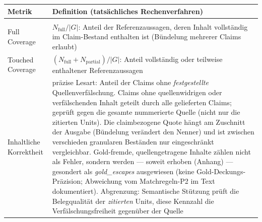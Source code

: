 
\begin{table}[htbp]
  \centering
  \small
  \begin{tabular}{>{\raggedright\arraybackslash}p{}>{\raggedright\arraybackslash}p{}}
    \hline
    \textbf{Metrik} & \textbf{Definition (tatsächliches Rechenverfahren)} \\
    \hline
    \multicolumn{2}{l}{\emph{Ergebnisqualität und Quellenbindung}} \\
    Full Coverage & $N_{\mathrm{full}}/|G|$: Anteil der Referenzaussagen, deren Inhalt vollständig im Claim-Bestand enthalten ist (Bündelung mehrerer Claims erlaubt) \\
    Touched Coverage & $(N_{\mathrm{full}}+N_{\mathrm{partial}})/|G|$: Anteil vollständig oder teilweise enthaltener Referenzaussagen \\
    Inhaltliche Korrektheit & präzise Lesart: Anteil der Claims ohne \emph{festgestellte} Quellenverfälschung. Claims ohne quellenwidrigen oder verfälschenden Inhalt geteilt durch alle gelieferten Claims; geprüft gegen die gesamte nummerierte Quelle (nicht nur die zitierten Units). Die claimbezogene Quote hängt am Zuschnitt der Ausgabe (Bündelung verändert den Nenner) und ist zwischen verschieden granularen Beständen nur eingeschränkt vergleichbar. Gold-fremde, quellengetragene Inhalte zählen nicht als Fehler, sondern werden --- soweit erhoben (Anhang) --- gesondert als \emph{gold\_escapes} ausgewiesen (keine Gold-Deckungs-Präzision; Abweichung vom Matchregeln-P2 im Text dokumentiert). Abgrenzung: Semantische Stützung prüft die Belegqualität der \emph{zitierten} Units, diese Kennzahl die Verfälschungsfreiheit gegenüber der Quelle \\

\end{tabular}
\end{table}
